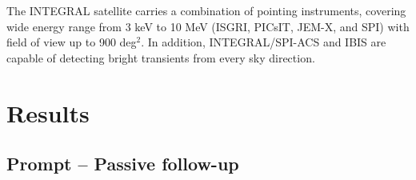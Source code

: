 \documentclass[a0,portrait]{a0poster}
\newcommand{\ECM}[1] {\textbf{\textcolor{magenta}{#1}}}
\begin{document}
\begin{multicols}{2}

The INTEGRAL satellite carries a combination of pointing instruments,
covering wide energy range from 3 keV to 10 MeV (ISGRI, PICsIT, JEM-X,
and SPI) with field of view up to 900 deg$^2$. In addition,
INTEGRAL/SPI-ACS and IBIS are capable of detecting bright transients
from every sky direction.


\section*{Results}

\subsection*{Prompt -- Passive follow-up}


\end{multicols}
\end{document}
